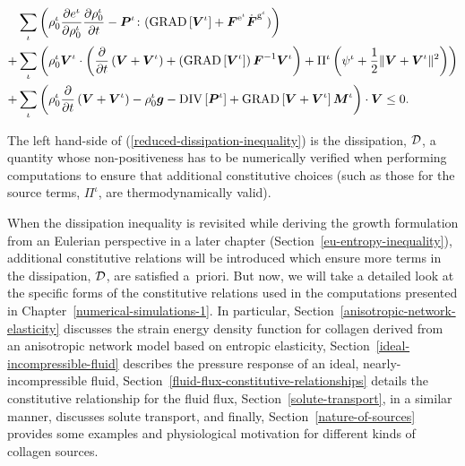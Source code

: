 \begin{equation}
\begin{split}
&\sum\limits_{\iota}\left(\rho^\iota_0\frac{\partial
    e^\iota}{\partial\rho^\iota_0}\frac{\partial
    \rho^\iota_0}{\partial t} -
  \mbox{\boldmath$ P$}^\iota\colon(\mathrm{GRAD}\left[\mbox{\boldmath$ V$}^\iota\right] +
  \mbox{\boldmath$ F$}^{\mathrm{e}^\iota}\dot{\mbox{\boldmath$ F$}}^{\mathrm{g}^\iota})\right)\\ +&
  \sum\limits_{\iota}\left(
  \rho^\iota_0\mbox{\boldmath$ V$}^\iota\cdot\left(\frac{\partial}{\partial t}
  \left(\mbox{\boldmath$ V$}+\mbox{\boldmath$ V$}^\iota\right) +
  \left(\mathrm{GRAD}\left[\mbox{\boldmath$ V$}^\iota\right]\right)
  \mbox{\boldmath$ F$}^{-1}\mbox{\boldmath$ V$}^\iota\right)+\Pi^\iota\left(\psi^\iota +
  \frac{1}{2}\Vert\mbox{\boldmath$ V$}+\mbox{\boldmath$ V$}^\iota\Vert^2\right)\right)\\+
  &\sum\limits_{\iota} \left(\rho^\iota_0\frac{\partial}{\partial
    t}\left(\mbox{\boldmath$ V$}+\mbox{\boldmath$ V$}^\iota\right) - \rho_0^\iota\mbox{\boldmath$ g$} -
  \mathrm{DIV}\left[\mbox{\boldmath$ P$}^\iota\right] +
  \mathrm{GRAD}\left[\mbox{\boldmath$ V$}+\mbox{\boldmath$ V$}^\iota\right]\mbox{\boldmath$ M$}^\iota\right)\cdot\mbox{\boldmath$ V$} \le
  0.
\label{reduced-dissipation-inequality}
\end{split}
\end{equation}

\noindent The left hand-side of (\ref{reduced-dissipation-inequality})
is the dissipation, ${\mathcal D}$, a quantity whose non-positiveness has to be
numerically verified when performing computations to ensure that
additional constitutive choices (such as those for the source terms,
$\Pi^{\iota}$, are thermodynamically valid).

When the dissipation inequality is revisited while deriving the growth
formulation from an Eulerian perspective in a later chapter
(Section~\ref{eu-entropy-inequality}), additional constitutive
relations will be introduced which ensure more terms in the
dissipation, ${\mathcal D}$, are satisfied a~priori. But now, we will take a
detailed look at the specific forms of the constitutive relations used
in the computations presented in
Chapter~\ref{numerical-simulations-1}. In particular,
Section~\ref{anisotropic-network-elasticity} discusses the strain
energy density function for collagen derived from an anisotropic
network model based on entropic elasticity,
Section~\ref{ideal-incompressible-fluid} describes the pressure
response of an ideal, nearly-incompressible fluid,
Section~\ref{fluid-flux-constitutive-relationships} details the
constitutive relationship for the fluid flux,
Section~\ref{solute-transport}, in a similar manner, discusses solute
transport, and finally, Section~\ref{nature-of-sources} provides some
examples and physiological motivation for different kinds of collagen
sources.

